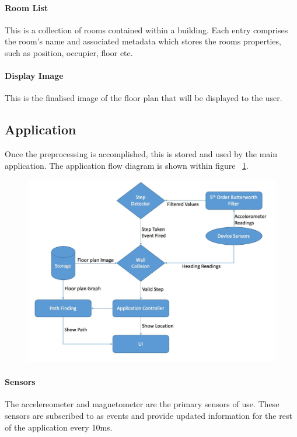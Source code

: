 \documentclass[12pt,a4paper]{report}
\begin{document}
\paragraph{Room List}
This is a collection of rooms contained within a building. Each entry comprises the room's name and associated metadata which stores the rooms properties, such as position, occupier, floor etc.

\paragraph{Display Image}
This is the finalised image of the floor plan that will be displayed to the user.

\subsection{Application}
Once the preprocessing is accomplished, this is stored and used by the main application. The application flow diagram is shown within figure ~\ref{fig:appFlow}.

\begin{figure}[h]
\includegraphics[width=\textwidth]{images/appFlow.png}
\label{fig:appFlow}
\end{figure}

\paragraph{Sensors}
The accelereometer and magnetometer are the primary sensors of use. These sensors are subscribed to as events and provide updated information for the rest of the application every 10ms.
\end{document}
